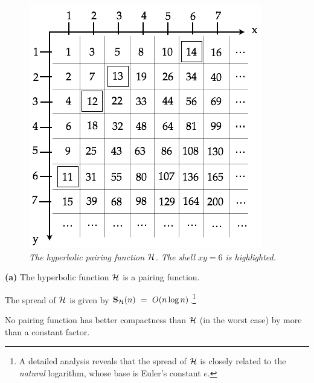 \begin{figure}[htb]
\begin{center}
      \includegraphics[scale=0.4]{FiguresArithmetic/PairingHyper}
\end{center}
\caption{{\it The hyperbolic pairing function $\mbox{$\cal H$}$.  The shell $xy = 6$ is
highlighted.}
\label{fig:pairingHyper}}
\end{figure}


\begin{prop}
\label{thm:hyp-opt}
{\bf (a)}
The hyperbolic function $\mbox{$\cal H$}$ is a pairing function.

The spread of $\mbox{$\cal H$}$ is given by
${\bf S}_{\cal H}(n) \ = \ O(n \log n)$.\footnote{A  detailed
  analysis reveals that the spread of $\cal H$ is closely related to
  the {\em natural} logarithm, whose base is Euler's constant $e$.}

No pairing function has better compactness than $\mbox{$\cal H$}$ (in the worst
case) by more than a constant factor.
\end{prop}

